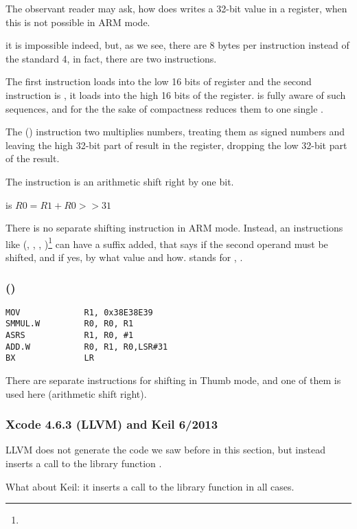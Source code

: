 The observant reader may ask, how does \MOV writes a 32-bit value in a register, when this is not possible in ARM mode.

it is impossible indeed, but, as we see,
there are 8 bytes per instruction instead of the standard 4,
in fact, there are two instructions.

The first instruction loads  into the low 16 bits of register and the second instruction is
, it loads  into the high 16 bits of the register.
\IDA is fully aware of such sequences, and for the the sake of compactness reduces them to one single .

The  () 
instruction two multiplies numbers, treating them as signed numbers
and leaving the high 32-bit part of result in the  register,
dropping the low 32-bit part of the result.

The instruction is an arithmetic shift right by one bit.

 is $R0=R1 + R0>>31$

\label{shifts_in_ARM_mode}

There is no separate shifting instruction in ARM mode.
Instead, an instructions like 
(\MOV, \ADD, \SUB, )\footnote{\DataProcessingInstructionsFootNote}
can have a suffix added, that says if the second operand must be shifted, and if yes, by what value and how.
 stands for , \EMDASH{}.

\subsubsection{\OptimizingXcodeIV (\ThumbTwoMode)}

\begin{lstlisting}
MOV             R1, 0x38E38E39
SMMUL.W         R0, R0, R1
ASRS            R1, R0, #1
ADD.W           R0, R1, R0,LSR#31
BX              LR
\end{lstlisting}


There are separate instructions for shifting in Thumb mode, 
and one of them is used here\EMDASH{} (arithmetic shift right).

\subsubsection{\NonOptimizing Xcode 4.6.3 (LLVM) and Keil 6/2013}

\NonOptimizing LLVM
does not generate the code we saw before in this section, but instead inserts a call to the library function 
.

What about Keil: it inserts a call to the library function  in all cases.
